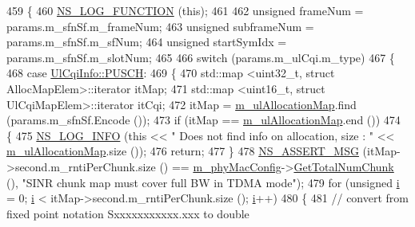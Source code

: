 \begin{DoxyCode}
459 \{
460   \hyperlink{log-macros-disabled_8h_a90b90d5bad1f39cb1b64923ea94c0761}{NS\_LOG\_FUNCTION} (\textcolor{keyword}{this});
461 
462         \textcolor{keywordtype}{unsigned} frameNum = params.m\_sfnSf.m\_frameNum;
463         \textcolor{keywordtype}{unsigned} subframeNum =  params.m\_sfnSf.m\_sfNum;
464         \textcolor{keywordtype}{unsigned} startSymIdx =  params.m\_sfnSf.m\_slotNum;
465 
466         \textcolor{keywordflow}{switch} (params.m\_ulCqi.m\_type)
467         \{
468                 \textcolor{keywordflow}{case} \hyperlink{structns3_1_1UlCqiInfo_a8241de30e4fdc8640e892ddf1e2a6c00a6d4b515df7c45a6843584459fbde26a7}{UlCqiInfo::PUSCH}:
469                 \{
470                         std::map <uint32\_t, struct AllocMapElem>::iterator itMap;
471                         std::map <uint16\_t, struct UlCqiMapElem>::iterator itCqi;
472                         itMap = \hyperlink{classns3_1_1MmWaveFlexTtiMaxRateMacScheduler_af147a6545a940d5bd3394db2054582ab}{m\_ulAllocationMap}.find (params.m\_sfnSf.Encode ());
473                         \textcolor{keywordflow}{if} (itMap == \hyperlink{classns3_1_1MmWaveFlexTtiMaxRateMacScheduler_af147a6545a940d5bd3394db2054582ab}{m\_ulAllocationMap}.end ())
474                         \{
475                                 \hyperlink{group__logging_gafbd73ee2cf9f26b319f49086d8e860fb}{NS\_LOG\_INFO} (\textcolor{keyword}{this} << \textcolor{stringliteral}{" Does not find info on allocation, size : 
      "} << \hyperlink{classns3_1_1MmWaveFlexTtiMaxRateMacScheduler_af147a6545a940d5bd3394db2054582ab}{m\_ulAllocationMap}.size ());
476                                 \textcolor{keywordflow}{return};
477                         \}
478                         \hyperlink{assert_8h_aff5ece9066c74e681e74999856f08539}{NS\_ASSERT\_MSG} (itMap->second.m\_rntiPerChunk.size () == 
      \hyperlink{classns3_1_1MmWaveMacScheduler_a24d7af4971d2e500fe543cefbafa2fd9}{m\_phyMacConfig}->\hyperlink{classns3_1_1MmWavePhyMacCommon_a97e82c809a351fea9d5058ac1bb4c3c6}{GetTotalNumChunk} (), \textcolor{stringliteral}{"SINR chunk map must cover full BW in
       TDMA mode"});
479                         \textcolor{keywordflow}{for} (\textcolor{keywordtype}{unsigned} \hyperlink{bernuolliDistribution_8m_a6f6ccfcf58b31cb6412107d9d5281426}{i} = 0; \hyperlink{bernuolliDistribution_8m_a6f6ccfcf58b31cb6412107d9d5281426}{i} < itMap->second.m\_rntiPerChunk.size (); 
      \hyperlink{bernuolliDistribution_8m_a6f6ccfcf58b31cb6412107d9d5281426}{i}++)
480                         \{
481                                 \textcolor{comment}{// convert from fixed point notation Sxxxxxxxxxxx.xxx to double}

\end{DoxyCode}
